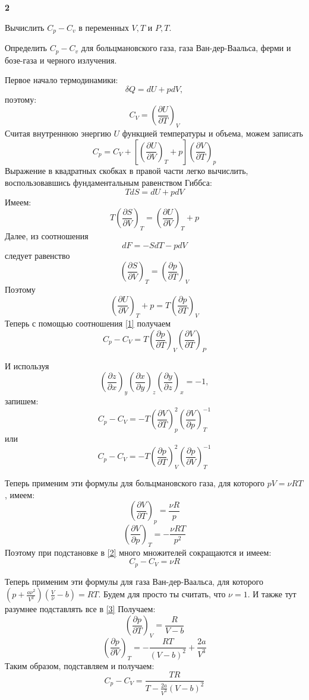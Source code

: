 \documentclass[a4paper,12pt]{article} %
\begin{document}
\begin{task}\textbf{2}

Вычислить $ C_p-C_v$ в  переменных $ V, T $ и $ P, T$. 

Определить $ C_p-C_v$ для больцмановского газа,
газа Ван-дер-Ваальса, ферми и бозе-газа и черного излучения.

Первое начало термодинамики:
$$
\delta Q=d U+p d V,
$$
поэтому:
$$
C_{V}=\left(\frac{\partial U}{\partial T}\right)_{V}
$$
Считая внутреннюю энергию $U$ функцией температуры и объема, можем записать
\begin{equation}\label{1}
C_{p}=C_{V}+\left[\left(\frac{\partial U}{\partial V}\right)_{T}+p\right]\left(\frac{\partial V}{\partial T}\right)_{p}
\end{equation}
Выражение в квадратных скобках в правой части легко вычислить, воспользовавшись фундаментальным равенством Гиббса:
$$
T d S=d U+p d V
$$
Имеем:
$$
T\left(\frac{\partial S}{\partial V}\right)_{T}=\left(\frac{\partial U}{\partial V}\right)_{T}+p
$$
Далее, из соотношения
$$
d F=-S d T-p d V
$$
следует равенство
$$
\left(\frac{\partial S}{\partial V}\right)_{T}=\left(\frac{\partial p}{\partial T}\right)_{V}
$$
Поэтому
$$
\left(\frac{\partial U}{\partial V}\right)_{T}+p=T\left(\frac{\partial p}{\partial T}\right)_{V}
$$
Теперь с помощью соотношения \ref{1} получаем
$$
C_{p}-C_{V}=T\left(\frac{\partial p}{\partial T}\right)_{V}\left(\frac{\partial V}{\partial T}\right)_{P}
$$

И используя 
\[ \left(\frac{\partial z}{\partial x}\right)_{y}\left(\frac{\partial x}{\partial y}\right)_{z}\left(\frac{\partial y}{\partial z}\right)_{x}=-1, \]
запишем:
\begin{equation}\label{2}
C_{p}-C_{V}=
-T\left(\frac{\partial V}{\partial T}\right)_{p}^{2}\left(\frac{\partial V}{\partial p}\right)_{T}^{-1}
\end{equation}
или
\begin{equation}\label{3}
C_{p}-C_{V}=
-T\left(\frac{\partial p}{\partial T}\right)_{V}^{2}\left(\frac{\partial p}{\partial V}\right)_{T}^{-1}
\end{equation}


Теперь применим эти формулы для больцмановского газа, для которого $ pV=\nu RT $, имеем:
\[ \left(\frac{\partial V}{\partial T}\right)_{p}=\frac{\nu R}{p} \]
\[\left(\frac{\partial V}{\partial p}\right)_{T} =-\frac{\nu RT}{p^2} \]
Поэтому при подстановке в \ref{2} много множителей сокращаются и имеем:
\[ C_p-C_V=\nu R \]

Теперь применим эти формулы для газа Ван-дер-Ваальса, для которого $ \left(p+\frac{a\nu^2}{V^{2}}\right)\left(\frac{V}{\nu}-b\right)=R T$. 
Будем для просто ты считать, что $\nu=1$. 
И также тут разумнее подставлять все в \ref{3}
Получаем:
\[ \left(\frac{\partial p}{\partial T}\right)_{V}=\frac{R}{V-b} \]
\[ \left(\frac{\partial p}{\partial V}\right)_{T}=-\frac{RT}{(V-b)^2}+\frac{2a}{V^3} \]
Таким образом, подставляем и получаем:
\[ C_p-C_V=\frac{TR}{T-\frac{2a}{V^3}\left(V-b\right)^2} \]



\end{task}
\end{document}
